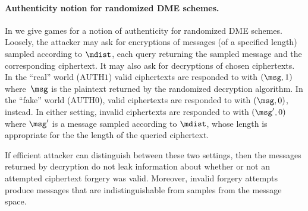 \paragraph{Authenticity notion for randomized DME schemes.}
  In  we give
games for a notion of authenticity for randomized DME schemes.
Loosely, the attacker may ask for encryptions of messages (of a
specified length) sampled according to $\mdist$, each query returning
the sampled message and the corresponding ciphertext.  It may also ask
for decryptions of chosen ciphertexts.  In the ``real'' world
($\mathrm{AUTH1}$) valid ciphertexts are responded to with $(\msg,1)$
where~$\msg$ is the plaintext returned by the randomized decryption
algorithm.  In the ``fake'' world ($\mathrm{AUTH0}$), valid
ciphertexts are responded to with $(\msg,0)$, instead.  In either
setting, invalid ciphertexts are responded to with $(\msg',0)$ where
$\msg'$ is a message sampled according to $\mdist$, whose length is
appropriate for the the length of the queried ciphertext.  

If efficient attacker can distinguish between these two settings, then
the messages returned by decryption do not leak information about
whether or not an attempted ciphertext forgery was valid.  Moreover,
invalid forgery attempts produce messages that are indistinguishable
from samples from the message space.

